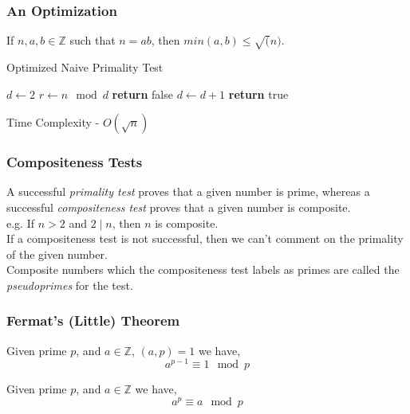 \documentclass{beamer}
\begin{document}
\begin{frame}
\frametitle{An Optimization}

If $n,a,b \in \mathbb{Z}$ such that $n = ab$, then $min(a,b) \leq \sqrt(n)$.

\begin{algorithm}[H]
\caption{Optimized Naive Primality Test}
\label{alg:OptimizedNaivePrimalityTest}
\begin{algorithmic}
\State $d\gets 2$
\State $r\gets n \mod d$
	\State \textbf{return} false 
\EndIf
\State $d \gets d+1$
\EndWhile
\State \textbf{return} true 
\EndProcedure
\end{algorithmic}
\end{algorithm}

Time Complexity - $O(\sqrt n)$
\end{frame}

\begin{frame}
\frametitle{Compositeness Tests}

A successful \emph{primality test} proves that a given number is prime, whereas a successful \emph{compositeness test} proves that a given number is composite. 
\\[3mm]
e.g. If $n > 2$ and $2 \mid n$, then $n$ is composite.
\\[3mm]
If a compositeness test is not successful, then we can't comment on the primality of the given number.
\\[3mm]
Composite numbers which the compositeness test labels as primes are called the \emph{pseudoprimes} for the test.

\end{frame}

\begin{frame}
\frametitle{Fermat's (Little) Theorem}

\begin{theorem}
\label{theorem:FermatLittleTheorem}
Given prime $p$, and $a \in \mathbb{Z}$, $(a,p) = 1$ we have,
\[ a^{p-1} \equiv 1 \mod p \]
\end{theorem}

\begin{corollary}[1]
\label{corollary:BetterFermatLittleTheorem}
Given prime $p$, and $a \in \mathbb{Z}$ we have,
\[ a^p \equiv a \mod p \]
\end{corollary}

\end{frame}
\end{document}
